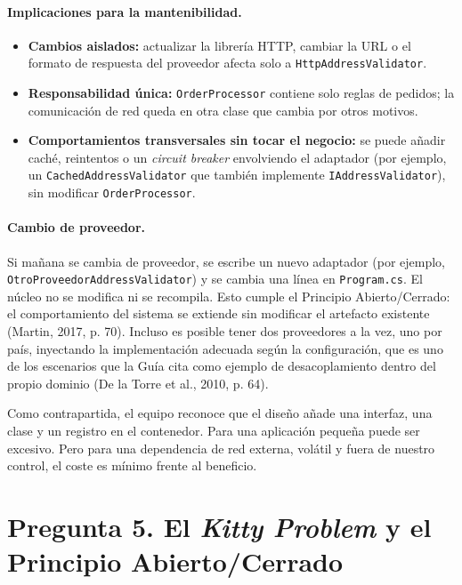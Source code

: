 \documentclass[11pt,a4paper]{article}
\begin{document}
\paragraph{Implicaciones para la mantenibilidad.}
\begin{itemize}[leftmargin=1.5em]
  \item \textbf{Cambios aislados:} actualizar la librería HTTP, cambiar la URL o el formato de respuesta del proveedor afecta solo a \texttt{HttpAddressValidator}.
  \item \textbf{Responsabilidad única:} \texttt{OrderProcessor} contiene solo reglas de pedidos; la comunicación de red queda en otra clase que cambia por otros motivos.
  \item \textbf{Comportamientos transversales sin tocar el negocio:} se puede añadir caché, reintentos o un \emph{circuit breaker} envolviendo el adaptador (por ejemplo, un \texttt{CachedAddressValidator} que también implemente \texttt{IAddressValidator}), sin modificar \texttt{OrderProcessor}.
\end{itemize}

\paragraph{Cambio de proveedor.} Si mañana se cambia de proveedor, se escribe un nuevo adaptador (por ejemplo, \texttt{OtroProveedorAddressValidator}) y se cambia una línea en \texttt{Program.cs}. El núcleo no se modifica ni se recompila. Esto cumple el Principio Abierto/Cerrado: el comportamiento del sistema se extiende sin modificar el artefacto existente (Martin, 2017, p. 70). Incluso es posible tener dos proveedores a la vez, uno por país, inyectando la implementación adecuada según la configuración, que es uno de los escenarios que la Guía cita como ejemplo de desacoplamiento dentro del propio dominio (De la Torre et al., 2010, p. 64).

Como contrapartida, el equipo reconoce que el diseño añade una interfaz, una clase y un registro en el contenedor. Para una aplicación pequeña puede ser excesivo. Pero para una dependencia de red externa, volátil y fuera de nuestro control, el coste es mínimo frente al beneficio.

\section{Pregunta 5. El \emph{Kitty Problem} y el Principio Abierto/Cerrado}
\end{document}
